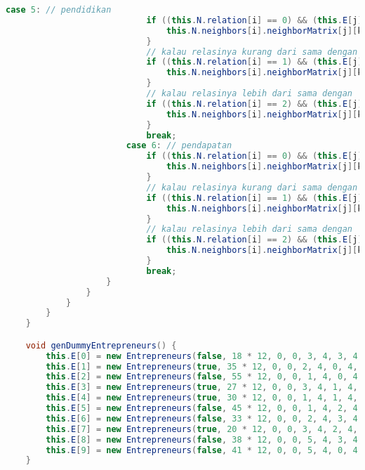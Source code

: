 \begin{lstlisting}[language=Java, caption=CA.java]
                        case 5: // pendidikan
                            if ((this.N.relation[i] == 0) && (this.E[j].education == this.E[k].education)) {
                                this.N.neighbors[i].neighborMatrix[j][k] = 1.0;
                            }
                            // kalau relasinya kurang dari sama dengan
                            if ((this.N.relation[i] == 1) && (this.E[j].education <= this.E[k].education)) {
                                this.N.neighbors[i].neighborMatrix[j][k] = 1.0;
                            }
                            // kalau relasinya lebih dari sama dengan
                            if ((this.N.relation[i] == 2) && (this.E[j].education >= this.E[k].education)) {
                                this.N.neighbors[i].neighborMatrix[j][k] = 1.0;
                            }
                            break;
                        case 6: // pendapatan
                            if ((this.N.relation[i] == 0) && (this.E[j].income == this.E[k].income)) {
                                this.N.neighbors[i].neighborMatrix[j][k] = 1.0;
                            }
                            // kalau relasinya kurang dari sama dengan
                            if ((this.N.relation[i] == 1) && (this.E[j].income <= this.E[k].income)) {
                                this.N.neighbors[i].neighborMatrix[j][k] = 1.0;
                            }
                            // kalau relasinya lebih dari sama dengan
                            if ((this.N.relation[i] == 2) && (this.E[j].income >= this.E[k].income)) {
                                this.N.neighbors[i].neighborMatrix[j][k] = 1.0;
                            }
                            break;
                    }
                }
            }
        }
    }

    void genDummyEntrepreneurs() {
        this.E[0] = new Entrepreneurs(false, 18 * 12, 0, 0, 3, 4, 3, 4, 0, 0.0);
        this.E[1] = new Entrepreneurs(true, 35 * 12, 0, 0, 2, 4, 0, 4, 1, 0.0);
        this.E[2] = new Entrepreneurs(false, 55 * 12, 0, 0, 1, 4, 0, 4, 2, 0.0);
        this.E[3] = new Entrepreneurs(true, 27 * 12, 0, 0, 3, 4, 1, 4, 1, 0.0);
        this.E[4] = new Entrepreneurs(true, 30 * 12, 0, 0, 1, 4, 1, 4, 0, 0.0);
        this.E[5] = new Entrepreneurs(false, 45 * 12, 0, 0, 1, 4, 2, 4, 4, 0.0);
        this.E[6] = new Entrepreneurs(false, 33 * 12, 0, 0, 2, 4, 3, 4, 2, 0.0);
        this.E[7] = new Entrepreneurs(true, 20 * 12, 0, 0, 3, 4, 2, 4, 0, 0.0);
        this.E[8] = new Entrepreneurs(false, 38 * 12, 0, 0, 5, 4, 3, 4, 1, 0.0);
        this.E[9] = new Entrepreneurs(false, 41 * 12, 0, 0, 5, 4, 0, 4, 0, 0.0);
    }


\end{lstlisting}
